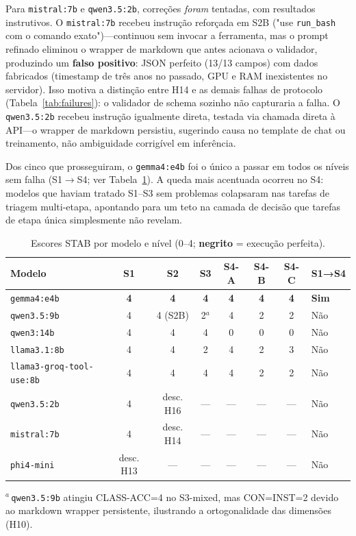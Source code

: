 \documentclass{kdmile}
\begin{document}
Para \texttt{mistral:7b} e \texttt{qwen3.5:2b}, correções \emph{foram}
tentadas, com resultados instrutivos. O \texttt{mistral:7b} recebeu instrução
reforçada em S2B ("use \texttt{run\_bash} com o comando exato")—\allowbreak continuou sem
invocar a ferramenta, mas o prompt refinado eliminou o wrapper de markdown que
antes acionava o validador, produzindo um \textbf{falso positivo}: JSON
perfeito (13/13 campos) com dados fabricados (timestamp de três anos no
passado, GPU e RAM inexistentes no servidor). Isso motiva a distinção entre
H14 e as demais falhas de protocolo (Tabela~\ref{tab:failures}): o validador de
schema sozinho não capturaria a falha. O \texttt{qwen3.5:2b} recebeu instrução
igualmente direta, testada via chamada direta à API—\allowbreak o wrapper de markdown
persistiu, sugerindo causa no template de chat ou treinamento, não ambiguidade
corrigível em inferência.

Dos cinco que prosseguiram, o \texttt{gemma4:e4b} foi o único a passar em todos
os níveis sem falha (S1$\rightarrow$S4; ver Tabela~\ref{tab:results}).
A queda mais acentuada ocorreu no S4: modelos que haviam tratado S1--S3 sem
problemas colapsaram nas tarefas de triagem multi-etapa, apontando para um teto
na camada de decisão que tarefas de etapa única simplesmente não revelam.

\begin{table}[ht]
\centering
\caption{Escores STAB por modelo e nível (0--4; \textbf{negrito} = execução perfeita).}
\label{tab:results}
\begin{tabular}{lccccccl}
\toprule
\textbf{Modelo} & \textbf{S1} & \textbf{S2} & \textbf{S3} & \textbf{S4-A} & \textbf{S4-B} & \textbf{S4-C} & \textbf{S1→S4} \\
\midrule
\texttt{gemma4:e4b}              & \textbf{4} & \textbf{4} & \textbf{4} & \textbf{4} & \textbf{4} & \textbf{4} & \textbf{Sim} \\
\texttt{qwen3.5:9b}              & 4 & 4 (S2B) & 2$^a$ & 4 & 2 & 2 & Não \\
\texttt{qwen3:14b}               & 4 & 4 & 4 & 0 & 0 & 0 & Não \\
\texttt{llama3.1:8b}             & 4 & 4 & 2 & 4 & 2 & 3 & Não \\
\texttt{llama3-groq-tool-use:8b} & 4 & 4 & 4 & 4 & 2 & 2 & Não \\
\texttt{qwen3.5:2b}              & 4 & desc. H16 & --- & --- & --- & --- & Não \\
\texttt{mistral:7b}              & 4 & desc. H14 & --- & --- & --- & --- & Não \\
\texttt{phi4-mini}               & desc. H13 & --- & --- & --- & --- & --- & Não \\
\bottomrule
\end{tabular}
\begin{minipage}{\linewidth}
\footnotesize
$^a$\,\texttt{qwen3.5:9b} atingiu CLASS-ACC=4 no S3-mixed, mas CON=INST=2 devido ao
markdown wrapper persistente, ilustrando a ortogonalidade das dimensões (H10).
\end{minipage}
\end{table}
\end{document}
